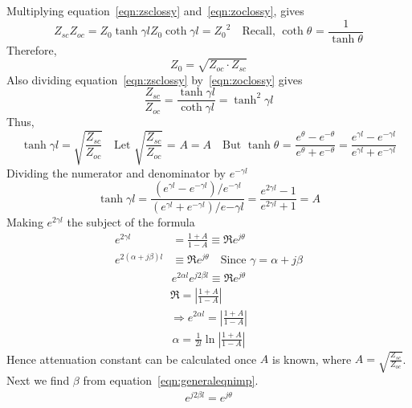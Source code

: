 Multiplying equation~\eqref{eqn:zsclossy} and~\eqref{eqn:zoclossy}, gives
\begin{dmath*}
Z_{sc}Z_{oc}
= Z_0\tanh\gamma l Z_0\coth\gamma l
= {Z_0}^2\quad\text{Recall, }\coth\theta\text{ = }\frac{1}{\tanh\theta}
\end{dmath*}
Therefore,
\begin{equation}
Z_0 = \sqrt{Z_{oc}\cdot Z_{sc}}
\label{eqn:xteristicsimplossy2}
\end{equation}
Also dividing equation~\eqref{eqn:zsclossy} by~\eqref{eqn:zoclossy} gives
\begin{dmath*}
\frac{Z_{sc}}{Z_{oc}} = \frac{\tanh\gamma l}{\coth\gamma l} 
= \tanh^2\gamma l
\end{dmath*}
Thus,
\begin{dmath*}
\tanh\gamma l = \sqrt{\frac{Z_{sc}}{Z_{oc}}}\quad\text{Let }\sqrt{\frac{Z_{sc}}{Z_{oc}}}\text{ = }A
= A\quad\text{But }\tanh \theta\text{ = }\frac{e^\theta - e^{-\theta}}{e^\theta + e^{-\theta}}
=\frac{e^{\gamma l} - e^{-\gamma l}}{e^{\gamma l} + e^{-\gamma l}}
\end{dmath*}
Dividing the numerator and denominator by $e^{-\gamma l}$
\begin{dmath*}
\tanh\gamma l = \frac{(e^{\gamma l} - e^{-\gamma l})/e^{-\gamma l}}{(e^{\gamma l} + e^{-\gamma l})/e{-\gamma l}}
= \frac{e^{2\gamma l} - 1}{e^{2\gamma l} + 1} = A
\end{dmath*}
Making $e^{2\gamma l}$ the subject of the formula
\begin{align*}
e^{2\gamma l} &= \frac{1 +A}{1 - A}\equiv \Re e^{j\theta}\\
e^{2(\alpha + j\beta)l} &\equiv \Re e^{j\theta}\quad\text{Since }\gamma = \alpha + j\beta
\end{align*}
\begin{align}
e^{2\alpha l}e^{j2\beta l} \equiv \Re e^{j\theta}
\label{eqn:generaleqnimp}
\end{align}
\begin{align*}
\Re = \left|\frac{1 + A}{1 - A}\right|\\ \Rightarrow e^{2\alpha l} = \left|\frac{1 + A}{1 - A}\right|
\end{align*}
\begin{align}
\alpha = \frac{1}{2l}\ln\left|\frac{1 + A}{1 - A}\right|
\end{align}
Hence attenuation constant can be calculated once $A$ is known, where $A = \sqrt{\frac{Z_{sc}}{Z_{oc}}}$. Next we find $\beta$ from equation~\eqref{eqn:generaleqnimp}.
\begin{align*}
e^{j2\beta l} = e^{j\theta}
\end{align*}
